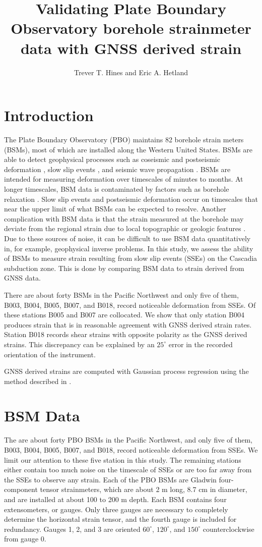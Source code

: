 \documentclass[10pt,a4paper]{article}
\title{Validating Plate Boundary Observatory borehole strainmeter data with GNSS derived strain}
\author{Trever T. Hines and Eric A. Hetland}
\begin{document}
\maketitle


\section{Introduction}\label{sec:Introduction}
The Plate Boundary Observatory (PBO) maintains 82 borehole strain meters (BSMs), most of which are installed along the Western United States. BSMs are able to detect geophysical processes such as coseismic and postseismic deformation \citep[e.g.,][]{Langbein2006,Langbein2015}, slow slip events \citep[e.g.,][]{Dragert2011}, and seismic wave propagation \citep{Barbour2017}. BSMs are intended for measuring deformation over timescales of minutes to months. At longer timescales, BSM data is contaminated by factors such as borehole relaxation \citep{Gladwin1987}. Slow slip events and postseismic deformation occur on timescales that near the upper limit of what BSMs can be expected to resolve. Another complication with BSM data is that the strain measured at the borehole may deviate from the regional strain due to local topographic or geologic features \citep{Berger1976}. Due to these sources of noise, it can be difficult to use BSM data quantitatively in, for example,  geophysical inverse problems. In this study, we assess the ability of BSMs to measure strain resulting from slow slip events (SSEs) on the Cascadia subduction zone. This is done by comparing BSM data to strain derived from GNSS data. 

There are about forty BSMs in the Pacific Northwest and only five of them, B003, B004, B005, B007, and B018, record noticeable deformation from SSEs. Of these stations B005 and B007 are collocated. We show that only station B004 produces strain that is in reasonable agreement with GNSS derived strain rates.  Station B018 records shear strains with opposite polarity as the GNSS derived strains. This discrepancy can be explained by an $25^\circ$ error in the recorded orientation of the instrument. 

GNSS derived strains are computed with Gaussian process regression using the method described in \citep{Hines2017}.   

\section{BSM Data}
The are about forty PBO BSMs in the Pacific Northwest, and only five of them, B003, B004, B005, B007, and B018, record noticeable deformation from SSEs. We limit our attention to these five station in this study.  The remaining stations either contain too much noise on the timescale of SSEs or are too far away from the SSEs to observe any strain. Each of the PBO BSMs are Gladwin four-component tensor strainmeters, which are about 2 m long, 8.7 cm in diameter, and are installed at about 100 to 200 m depth. Each BSM contains four extensometers, or gauges. Only three gauges are necessary to completely determine the horizontal strain tensor, and the fourth gauge is included for redundancy. Gauges 1, 2, and 3 are oriented $60^\circ$, $120^\circ$, and $150^\circ$ counterclockwise from gauge 0.   
\end{document}
